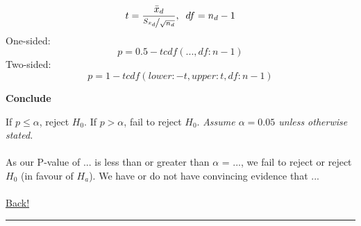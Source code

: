 \documentclass[main]{subfiles}
\begin{document}
\[t = \frac{\bar{x}_d}{\nicefrac{S_{x_d}}{\sqrt{n_d}}},\;\;df = n_d - 1\]
One-sided: \[p = 0.5 - tcdf(..., df: n - 1)\]
Two-sided: \[p = 1 - tcdf(lower: -t, upper: t, df: n - 1)\]

\noindent\textbf{Conclude}

If $p \leq \alpha$, reject $H_0$. If $p > \alpha$, fail to reject $H_0$.
\textit{Assume $\alpha = 0.05$ unless otherwise stated.}
\\~\\
As our P-value of ... is less than or greater than $\alpha$ = ..., we fail to reject or reject $H_0$ (in favour of $H_a$). 
We have or do not have convincing evidence that ...
\\~\\
\noindent\hyperlink{toc}{Back!}
\newline\hrule
\end{document}
